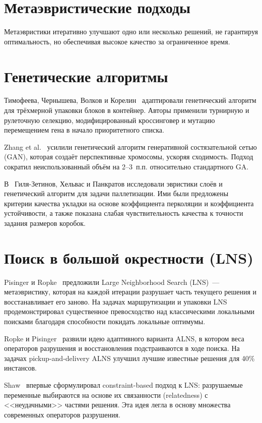\section{Метаэвристические подходы}

Метаэвристики итеративно улучшают одно или несколько решений, не гарантируя оптимальность, но обеспечивая высокое качество за ограниченное время.

\section{Генетические алгоритмы}

Тимофеева, Чернышева, Волков и Корелин~\cite{korelin} адаптировали генетический алгоритм для трёхмерной упаковки блоков в контейнер. Авторы применили турнирную и рулеточную селекцию, модифицированный кроссинговер и мутацию перемещением гена в начало приоритетного списка.

Zhang et al.~\cite{Zhang2024} усилили генетический алгоритм генеративной состязательной сетью (GAN), которая создаёт перспективные хромосомы, ускоряя сходимость. Подход сократил неиспользованный объём на 2--3~п.п. относительно стандартного GA.

В~\cite{TR-MFTI-khelvas2019-boxes, khel-EnT2019} Гиля-Зетинов, Хельвас и Панкратов исследовали эвристики слоёв и генетический алгоритм для задачи паллетизации. Ими были предложены критерии качества укладки на основе коэффициента перколяции и коэффициента устойчивости, а также показана слабая чувствительность качества к точности задания размеров коробок.

\section{Поиск в большой окрестности (LNS)}

Pisinger и Ropke~\cite{Pisinger2005} предложили Large Neighborhood Search (LNS)~--- метаэвристику, которая на каждой итерации разрушает часть текущего решения и восстанавливает его заново. На задачах маршрутизации и упаковки LNS продемонстрировал существенное превосходство над классическими локальными поисками благодаря способности покидать локальные оптимумы.

Ropke и Pisinger~\cite{Ropke2006} развили идею адаптивного варианта ALNS, в котором веса операторов разрушения и восстановления подстраиваются в ходе поиска. На задачах pickup-and-delivery ALNS улучшил лучшие известные решения для 40\% инстансов.

Shaw~\cite{Shaw2002} впервые сформулировал constraint-based подход к LNS: разрушаемые переменные выбираются на основе их связанности (relatedness) с <<неудачными>> частями решения. Эта идея легла в основу множества современных операторов разрушения.

